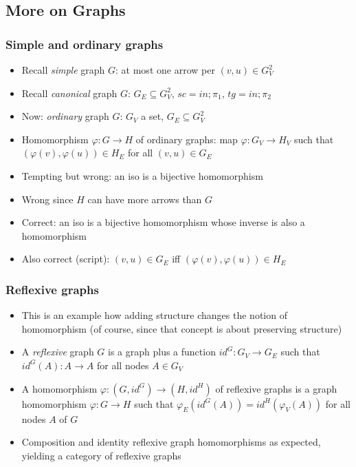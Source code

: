 \documentclass[handout]{beamer}
\begin{document}
\subsection{More on Graphs}

\frame
  {   
    \frametitle{Simple and ordinary graphs}\label{Ch2:oGraph}

 \begin{itemize}[<+->]
\item Recall \emph{simple} graph $G$: at most one arrow per $(v,u)\in G_V^2$
\item Recall \emph{canonical} graph $G$:  $G_E\subseteq G_V^2$, $sc=in{;}\pi_1$, $tg=in{;}\pi_2$
\item Now: \emph{ordinary} graph $G$:  $G_V$ a set, $G_E\subseteq G_V^2$
\item Homomorphism $\varphi: G\to H$ of ordinary graphs: map $\varphi: G_V\to H_V$
such that $(\varphi(v),\varphi(u))\in H_E$ for all $(v,u)\in G_E$
\item Tempting but wrong: an iso is a bijective homomorphism
\item Wrong since $H$ can have more arrows than $G$
\item Correct: an iso is a bijective homomorphism whose inverse is also a homomorphism
\item Also correct (script): $(v,u)\in G_E$ iff $(\varphi(v),\varphi(u))\in H_E$
 \end{itemize}

 }

\frame
  {   
    \frametitle{Reflexive graphs}\label{Ch2:rGraph}

 \begin{itemize}[<+->]
\item This is an example how adding structure changes the notion of homomorphism
(of course, since that concept is about preserving structure)
\item A \emph{reflexive} graph $G$ is a graph plus a function $id^G : G_V \to G_E$
such that $id^G(A): A \to A$ for all nodes $A\in G_V$
\item A homomorphism $\varphi: (G,id^G)\to (H,id^H)$ of reflexive graphs
is a graph homomorphism $\varphi: G\to H$ such 
that $\varphi_E(id^G(A)) = id^H(\varphi_V(A))$ for all nodes $A$ of $G$
\item Composition and identity reflexive graph homomorphisms as expected,
yielding a category of reflexive graphs
 \end{itemize}

 }
\end{document}
